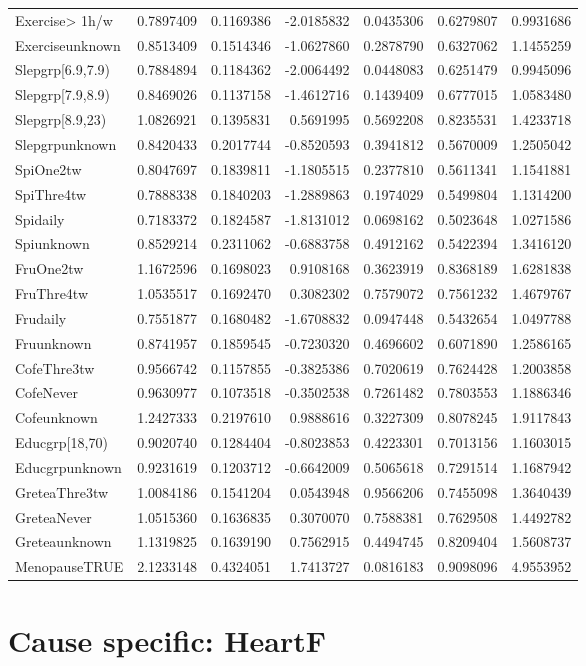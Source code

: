 \documentclass[]{article}
\begin{document}
\begin{longtable}[]{@{}lrrrrrr@{}}
Exercise\textgreater{} 1h/w & 0.7897409 & 0.1169386 & -2.0185832 &
0.0435306 & 0.6279807 & 0.9931686\tabularnewline
Exerciseunknown & 0.8513409 & 0.1514346 & -1.0627860 & 0.2878790 &
0.6327062 & 1.1455259\tabularnewline
Slepgrp{[}6.9,7.9) & 0.7884894 & 0.1184362 & -2.0064492 & 0.0448083 &
0.6251479 & 0.9945096\tabularnewline
Slepgrp{[}7.9,8.9) & 0.8469026 & 0.1137158 & -1.4612716 & 0.1439409 &
0.6777015 & 1.0583480\tabularnewline
Slepgrp{[}8.9,23) & 1.0826921 & 0.1395831 & 0.5691995 & 0.5692208 &
0.8235531 & 1.4233718\tabularnewline
Slepgrpunknown & 0.8420433 & 0.2017744 & -0.8520593 & 0.3941812 &
0.5670009 & 1.2505042\tabularnewline
SpiOne2tw & 0.8047697 & 0.1839811 & -1.1805515 & 0.2377810 & 0.5611341 &
1.1541881\tabularnewline
SpiThre4tw & 0.7888338 & 0.1840203 & -1.2889863 & 0.1974029 & 0.5499804
& 1.1314200\tabularnewline
Spidaily & 0.7183372 & 0.1824587 & -1.8131012 & 0.0698162 & 0.5023648 &
1.0271586\tabularnewline
Spiunknown & 0.8529214 & 0.2311062 & -0.6883758 & 0.4912162 & 0.5422394
& 1.3416120\tabularnewline
FruOne2tw & 1.1672596 & 0.1698023 & 0.9108168 & 0.3623919 & 0.8368189 &
1.6281838\tabularnewline
FruThre4tw & 1.0535517 & 0.1692470 & 0.3082302 & 0.7579072 & 0.7561232 &
1.4679767\tabularnewline
Frudaily & 0.7551877 & 0.1680482 & -1.6708832 & 0.0947448 & 0.5432654 &
1.0497788\tabularnewline
Fruunknown & 0.8741957 & 0.1859545 & -0.7230320 & 0.4696602 & 0.6071890
& 1.2586165\tabularnewline
CofeThre3tw & 0.9566742 & 0.1157855 & -0.3825386 & 0.7020619 & 0.7624428
& 1.2003858\tabularnewline
CofeNever & 0.9630977 & 0.1073518 & -0.3502538 & 0.7261482 & 0.7803553 &
1.1886346\tabularnewline
Cofeunknown & 1.2427333 & 0.2197610 & 0.9888616 & 0.3227309 & 0.8078245
& 1.9117843\tabularnewline
Educgrp{[}18,70) & 0.9020740 & 0.1284404 & -0.8023853 & 0.4223301 &
0.7013156 & 1.1603015\tabularnewline
Educgrpunknown & 0.9231619 & 0.1203712 & -0.6642009 & 0.5065618 &
0.7291514 & 1.1687942\tabularnewline
GreteaThre3tw & 1.0084186 & 0.1541204 & 0.0543948 & 0.9566206 &
0.7455098 & 1.3640439\tabularnewline
GreteaNever & 1.0515360 & 0.1636835 & 0.3070070 & 0.7588381 & 0.7629508
& 1.4492782\tabularnewline
Greteaunknown & 1.1319825 & 0.1639190 & 0.7562915 & 0.4494745 &
0.8209404 & 1.5608737\tabularnewline
MenopauseTRUE & 2.1233148 & 0.4324051 & 1.7413727 & 0.0816183 &
0.9098096 & 4.9553952\tabularnewline
\bottomrule
\end{longtable}

\hypertarget{cause-specific-heartf}{%
\section{Cause specific: HeartF}\label{cause-specific-heartf}}
\end{document}
